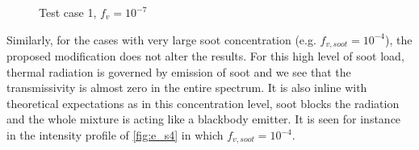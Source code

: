 \documentclass[3p]{elsarticle}
\begin{document}
\begin{figure}[hp]
	\centering{}
	\par\medskip		
	\centering{}
	\caption{Test case 1, \({f_v=10^{-7}}\)} \label{fig:e_s7}
\end{figure}
\pagebreak 
Similarly, for the cases with very large soot concentration (e.g. \(f_{v,soot}=10^{-4}\)), the proposed modification does not alter the results. For this high level of soot load, thermal radiation is governed by emission of soot and we see that the transmissivity is almost zero in the entire spectrum. It is also inline with theoretical expectations as in this concentration level, soot blocks the radiation and the whole mixture is acting like a blackbody emitter. It is seen for instance in the intensity profile of \cref{fig:e_s4} in which \(f_{v,soot}=10^{-4}\).
\end{document}
